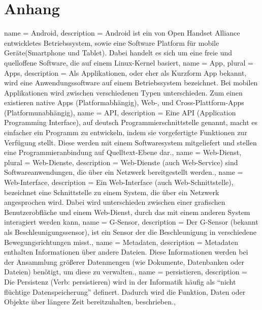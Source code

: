 \chapter{Anhang}
\printglossaries
{}
{
  name = Android,
  description = {Android ist ein von Open Handset Alliance entwickletes Betriebssystem, sowie eine Software Platform für mobile Geräte(\gls{Smartphone} und \gls{Tablet}). Dabei handelt es sich um eine freie und quelloffene Software, die auf einem Linux-Kernel basiert},
}
{
  name = App,
  plural = Apps,
  description = {Als Applikationen, oder eher als Kurzform App bekannt, wird eine Anwendungssoftware auf einem Betriebssystem bezeichnet. Bei mobilen Applikationen wird zwischen verschiedenen Typen unterschieden. Zum einen existieren native Apps (Platformabhängig), Web-, und Cross-Plattform-Apps (Platformunabhängig)},
}
{
  name = API,
  description = {Eine API (Application Programming Interface), auf deutsch Programmierschnittstelle genannt, macht es einfacher ein Programm zu entwickeln, indem sie vorgefertigte Funktionen zur Verfügung stellt. Diese werden mit einem Softwaresystem mitgeliefert und stellen eine Programmieranbindung auf Quelltext-Ebene dar.},
}
{
  name = Web-Dienst,
  plural = Web-Dienste,
  description = {Web-Dienste (auch Web-Service) sind Softwareanwendungen, die über ein Netzwerk bereitgestellt werden.},
}
{
  name = Web-Interface,
  description = {Ein Web-Interface (auch Web-Schnittstelle), bezeichnet eine Schnittstelle zu einem System, die über ein Netzwerk angesprochen wird. Dabei wird unterschieden zwischen einer grafischen Benutzerobfläche und einem \gls{Web-Dienst}, durch das mit einem anderen System interagiert werden kann},
}
{
  name = G-Sensor,
  description = {Der G-Sensor (bekannt als Beschleunigungssensor), ist ein Sensor der die Beschleunigung in verschiedene Bewegungsrichtungen misst.},
}
{
  name = Metadaten,
  description = {Metadaten enthalten Informationen über andere Dateien. Diese Informationen werden bei der Ansammlung größerer Datenmengen (wie Dokumente, Datenbanken oder Dateien) benötigt, um diese zu verwalten.},
}
{
  name = persistieren,
  description = {Die Persistenz (Verb: persistieren) wird in der Informatik häufig als ``nicht flüchtige Datenspeicherung'' definert. Dadurch wird die Funktion, Daten oder Objekte über längere Zeit bereitzuhalten, beschrieben.},
}
